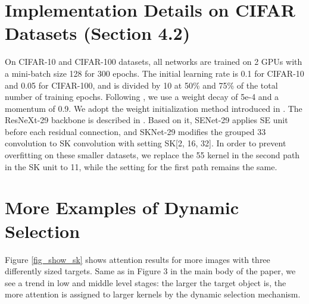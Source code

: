 \documentclass[10pt,twocolumn,letterpaper]{article}
\begin{document}
\begin{figure*}[t]
	\begin{center}
		\setlength{\fboxrule}{0pt}
		
		
	\end{center}	
	\vspace{-4pt}
	\caption{Attention results for two randomly sampled
		images with three differently sized targets (1.0x, 1.5x and 2.0x). The notations are the same as in Figure 3a,b. }
	\label{fig_show_sk}
	\vspace{-4pt}
\end{figure*}


\section{Implementation Details on CIFAR Datasets (Section 4.2)}

On CIFAR-10 and CIFAR-100 datasets, all networks are trained on 2 GPUs with a mini-batch size 128 for 300 epochs. The initial learning rate is 0.1 for CIFAR-10 and 0.05 for CIFAR-100, and is divided by 10 at 50\% and 75\% of the total number of training epochs. Following \cite{he2016deep}, we use a weight decay of 5e-4 and a momentum of 0.9. We adopt the weight initialization method introduced in \cite{he2015delving}. The ResNeXt-29 backbone is described in \cite{xie2017aggregated}. Based on it, SENet-29 applies SE unit before each residual connection, and SKNet-29 modifies the grouped 33 convolution to SK convolution with setting SK[2, 16, 32]. In order to prevent overfitting on these smaller datasets, we replace the 55 kernel in the second path in the SK unit to  11, while the setting for the first path remains the same.

\section{More Examples of Dynamic Selection}
Figure \ref{fig_show_sk} shows attention results for more images with three differently sized targets. Same as in Figure 3 in the main body of the paper, we see a trend in low and middle level stages: the larger the target object is, the more attention is assigned to larger kernels by the dynamic selection mechanism. 



	
\end{document}
